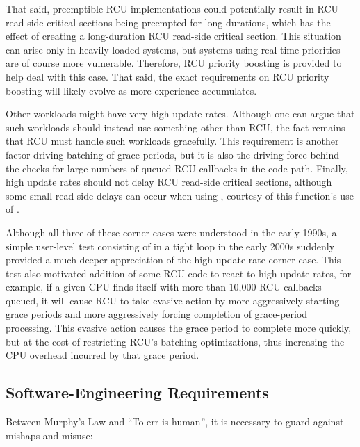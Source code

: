 That said, preemptible RCU implementations could potentially result in
RCU read-side critical sections being preempted for long durations,
which has the effect of creating a long-duration RCU read-side critical
section.
This situation can arise only in heavily loaded systems, but
systems using real-time priorities are of course more vulnerable.
Therefore, RCU priority boosting is provided to help deal with this
case.
That said, the exact requirements on RCU priority boosting will
likely evolve as more experience accumulates.

Other workloads might have very high update rates.
Although one can
argue that such workloads should instead use something other than RCU,
the fact remains that RCU must handle such workloads gracefully.
This
requirement is another factor driving batching of grace periods, but it
is also the driving force behind the checks for large numbers of queued
RCU callbacks in the  code path.
Finally, high update
rates should not delay RCU read-side critical sections, although some
small read-side delays can occur when using
, courtesy of this function's use of
.

Although all three of these corner cases were understood in the early
1990s, a simple user-level test consisting of  in a
tight loop in the early 2000s suddenly provided a much deeper
appreciation of the high-update-rate corner case.
This test also
motivated addition of some RCU code to react to high update rates, for
example, if a given CPU finds itself with more than 10,000 RCU callbacks
queued, it will cause RCU to take evasive action by more aggressively
starting grace periods and more aggressively forcing completion of
grace-period processing.
This evasive action causes the grace period to
complete more quickly, but at the cost of restricting RCU's batching
optimizations, thus increasing the CPU overhead incurred by that grace
period.


\subsection{Software-Engineering Requirements}

Between Murphy's Law and ``To err is human'', it is necessary to guard
against mishaps and misuse:

